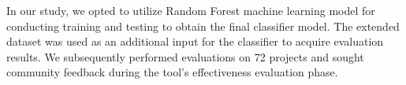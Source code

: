 \documentclass[sigconf,screen,review,anonymous]{acmart}
\begin{document}
{%
In our study, we opted to utilize Random Forest machine learning model for conducting training and testing to obtain the final classifier model. The extended dataset was used as an additional input for the classifier to acquire evaluation results. We subsequently performed evaluations on 72 projects and sought community feedback during the tool's effectiveness evaluation phase.


}
\end{document}
